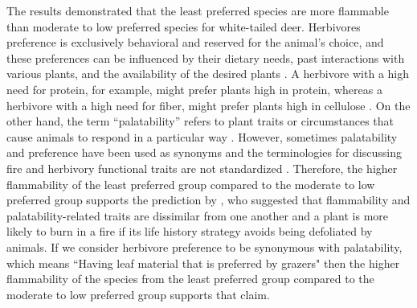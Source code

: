 \documentclass{ttuthes2007}
\begin{document}
The results demonstrated that the least preferred species are more flammable than moderate to low preferred species for white-tailed deer. Herbivores preference is exclusively behavioral and reserved for the animal's choice, and these preferences can be influenced by their dietary needs, past interactions with various plants, and the availability of the desired plants \citep{heady1964palatability, wright2003white, mayntz2005nutrient}. A herbivore with a high need for protein, for example, might prefer plants high in protein, whereas a herbivore with a high need for fiber, might prefer plants high in cellulose \citep{mayntz2005nutrient}. On the other hand, the term ``palatability'' refers to plant traits or circumstances that cause animals to respond in a particular way \citep{heady1964palatability}. However, sometimes palatability and preference have been used as synonyms \citep{ivins1952relative} and the terminologies for discussing fire and herbivory functional traits are not standardized \citep{archibald2019unified}. Therefore, the higher flammability of the least preferred group compared to the moderate to low preferred group supports the prediction by \citet{archibald2019unified}, who suggested that flammability and palatability-related traits are dissimilar from one another and a plant is more likely to burn in a fire if its life history strategy avoids being defoliated by animals. If we consider herbivore preference to be synonymous with palatability, which means ``Having leaf material that is preferred by grazers" \citep{archibald2019unified} then the higher flammability of the species from the least preferred group compared to the moderate to low preferred group supports that claim.
\end{document}
